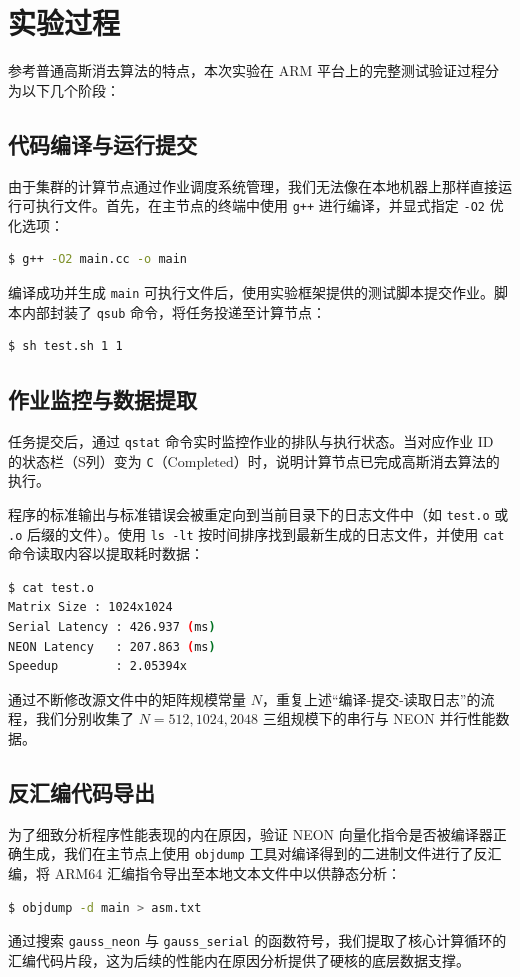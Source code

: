 \documentclass[a4paper]{article}
\begin{document}
\section{实验过程}
参考普通高斯消去算法的特点，本次实验在 ARM 平台上的完整测试验证过程分为以下几个阶段：

\subsection{代码编译与运行提交}
由于集群的计算节点通过作业调度系统管理，我们无法像在本地机器上那样直接运行可执行文件。首先，在主节点的终端中使用 \texttt{g++} 进行编译，并显式指定 \texttt{-O2} 优化选项：
\begin{lstlisting}[language=bash, frame=single, numbers=none]
$ g++ -O2 main.cc -o main
\end{lstlisting}

编译成功并生成 \texttt{main} 可执行文件后，使用实验框架提供的测试脚本提交作业。脚本内部封装了 \texttt{qsub} 命令，将任务投递至计算节点：
\begin{lstlisting}[language=bash, frame=single, numbers=none]
$ sh test.sh 1 1
\end{lstlisting}

\subsection{作业监控与数据提取}
任务提交后，通过 \texttt{qstat} 命令实时监控作业的排队与执行状态。当对应作业 ID 的状态栏（S列）变为 \texttt{C}（Completed）时，说明计算节点已完成高斯消去算法的执行。

程序的标准输出与标准错误会被重定向到当前目录下的日志文件中（如 \texttt{test.o} 或 \texttt{.o} 后缀的文件）。使用 \texttt{ls -lt} 按时间排序找到最新生成的日志文件，并使用 \texttt{cat} 命令读取内容以提取耗时数据：
\begin{lstlisting}[language=bash, frame=single, numbers=none]
$ cat test.o
Matrix Size : 1024x1024
Serial Latency : 426.937 (ms) 
NEON Latency   : 207.863 (ms) 
Speedup        : 2.05394x
\end{lstlisting}
通过不断修改源文件中的矩阵规模常量 $N$，重复上述“编译-提交-读取日志”的流程，我们分别收集了 $N=512, 1024, 2048$ 三组规模下的串行与 NEON 并行性能数据。

\subsection{反汇编代码导出}
为了细致分析程序性能表现的内在原因，验证 NEON 向量化指令是否被编译器正确生成，我们在主节点上使用 \texttt{objdump} 工具对编译得到的二进制文件进行了反汇编，将 ARM64 汇编指令导出至本地文本文件中以供静态分析：
\begin{lstlisting}[language=bash, frame=single, numbers=none]
$ objdump -d main > asm.txt
\end{lstlisting}
通过搜索 \texttt{gauss\_neon} 与 \texttt{gauss\_serial} 的函数符号，我们提取了核心计算循环的汇编代码片段，这为后续的性能内在原因分析提供了硬核的底层数据支撑。
\end{document}
